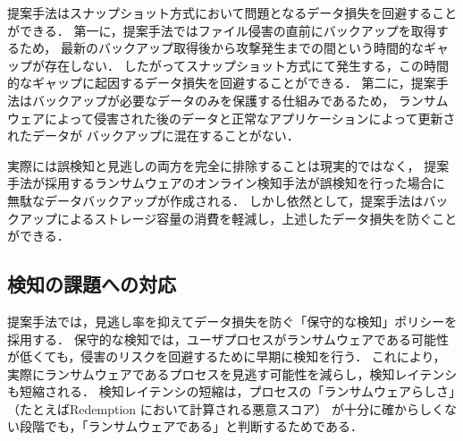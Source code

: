 提案手法はスナップショット方式において問題となるデータ損失を回避することができる．
第一に，提案手法ではファイル侵害の直前にバックアップを取得するため，
最新のバックアップ取得後から攻撃発生までの間という時間的なギャップが存在しない．
したがってスナップショット方式にて発生する，この時間的なギャップに起因するデータ損失を回避することができる．
第二に，提案手法はバックアップが必要なデータのみを保護する仕組みであるため，
ランサムウェアによって侵害された後のデータと正常なアプリケーションによって更新されたデータが
バックアップに混在することがない．

実際には誤検知と見逃しの両方を完全に排除することは現実的ではなく，
提案手法が採用するランサムウェアのオンライン検知手法が誤検知を行った場合に
無駄なデータバックアップが作成される．
しかし依然として，提案手法はバックアップによるストレージ容量の消費を軽減し，上述したデータ損失を防ぐことができる．

\subsection{検知の課題への対応}
提案手法では，見逃し率を抑えてデータ損失を防ぐ「保守的な検知」ポリシーを採用する．
保守的な検知では，ユーザプロセスがランサムウェアである可能性が低くても，侵害のリスクを回避するために早期に検知を行う．
これにより，実際にランサムウェアであるプロセスを見逃す可能性を減らし，検知レイテンシも短縮される．
検知レイテンシの短縮は，プロセスの「ランサムウェアらしさ」（たとえばRedemption \cite{kharraz2017redemption}において計算される悪意スコア）
が十分に確からしくない段階でも，「ランサムウェアである」と判断するためである．

